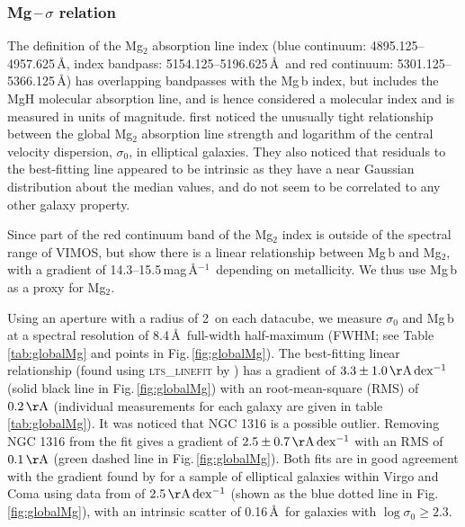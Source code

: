 		\subsubsection{Mg\,--\,$\sigma$ relation}
			\label{subsubssec:Mgsigma}
			The definition of the Mg$_2$ absorption line index (blue continuum: 4895.125--4957.625\,\AA, index bandpass: 5154.125--5196.625\,\AA\ and red continuum: 5301.125--5366.125\,\AA) has overlapping bandpasses with the Mg\,b index, but includes the MgH molecular absorption line, and is hence considered a molecular index and is measured in units of magnitude. \citet{Bender1993} first noticed the unusually tight relationship between the global Mg$_2$ absorption line strength and logarithm of the central velocity dispersion, $\sigma_0$, in elliptical galaxies. They also noticed that residuals to the best-fitting line appeared to be intrinsic as they have a near Gaussian distribution about the median values, and do not seem to be correlated to any other galaxy property. 

			Since part of the red continuum band of the Mg$_2$ index is outside of the spectral range of VIMOS, but \citet{Ziegler1997} show there is a linear relationship between Mg\,b and Mg$_2$, with a gradient of 14.3--15.5\,mag\,\AA$^{-1}$\ depending on metallicity. We thus use Mg\,b as a proxy for Mg$_2$. 

			Using an aperture with a radius of 2\arcsec\ on each datacube, we measure $\sigma_0$ and Mg\,b at a spectral resolution of 8.4\,\AA\ full-width half-maximum (FWHM; see Table \ref{tab:globalMg} and points in Fig.\,\ref{fig:globalMg}). The best-fitting linear relationship (found using \textsc{lts\_linefit} by \citealt{Cappellari2013}) has a gradient of $3.3 \pm 1.0 \,\mathrm{\AA\,dex^{-1}}$ (solid black line in Fig.\,\ref{fig:globalMg}) with an root-mean-square (RMS) of $0.2 \, \mathrm{\AA}$ (individual measurements for each galaxy are given in table \ref{tab:globalMg}). It was noticed that NGC 1316 is a possible outlier. Removing NGC 1316 from the fit gives a gradient of $2.5 \pm 0.7 \,\mathrm{\AA\,dex^{-1}}$ with an RMS of $0.1 \, \mathrm{\AA}$ (green dashed line in Fig.\,\ref{fig:globalMg}). Both fits are in good agreement with the gradient found by \citet{Ziegler1997} for a sample of elliptical galaxies within Virgo and Coma using data from \citet{Dressler1987} of $2.5\,\mathrm{\AA\,dex^{-1}}$ (shown as the blue dotted line in Fig.\,\ref{fig:globalMg}), with an intrinsic scatter of 0.16\,\AA\ for galaxies with $\log \sigma_0 \geqslant 2.3$. 


